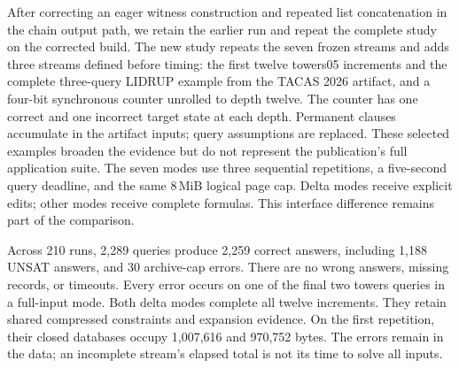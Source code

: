 \documentclass[11pt,a4paper]{article}
\numberwithin{equation}{section}
\theoremstyle{plain}
\theoremstyle{definition}
\theoremstyle{remark}
\begin{document}
After correcting an eager witness construction and repeated list concatenation in the chain output path, we retain the earlier run and repeat the complete study on the corrected build. The new study repeats the seven frozen streams and adds three streams defined before timing: the first twelve towers05 increments and the complete three-query LIDRUP example from the TACAS 2026 artifact, and a four-bit synchronous counter unrolled to depth twelve. The counter has one correct and one incorrect target state at each depth. Permanent clauses accumulate in the artifact inputs; query assumptions are replaced. These selected examples broaden the evidence but do not represent the publication's full application suite. The seven modes use three sequential repetitions, a five-second query deadline, and the same 8\,MiB logical page cap. Delta modes receive explicit edits; other modes receive complete formulas. This interface difference remains part of the comparison.

Across 210 runs, 2,289 queries produce 2,259 correct answers, including 1,188 UNSAT answers, and 30 archive-cap errors. There are no wrong answers, missing records, or timeouts. Every error occurs on one of the final two towers queries in a full-input mode. Both delta modes complete all twelve increments. They retain shared compressed constraints and expansion evidence. On the first repetition, their closed databases occupy 1,007,616 and 970,752 bytes. The errors remain in the data; an incomplete stream's elapsed total is not its time to solve all inputs.
\end{document}

